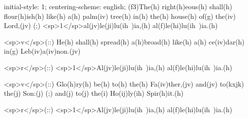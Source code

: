 initial-style: 1;
centering-scheme: english;
(f3)The(h) right(h)eous(h) shall(h) flour(h)ish(h) like(h) a(h) palm(iv) tree(h) in(h) the(h) house(h) of(g) the(iv) Lord,(jv) (;) <sp>1</sp>al(jv)le(ji)lu(ih~)ia,(h) al(f)le(hi)lu(ih~)ia.(h)

<sp>v</sp>(::) He(h) shall(h) spread(h) a(h)broad(h) like(h) a(h) ce(iv)dar(h) in(g) Leb(iv)a(iv)non.(jv)

<sp>r</sp>(::) <sp>1</sp>Al(jv)le(ji)lu(ih~)ia,(h) al(f)le(hi)lu(ih~)ia.(h)

<sp>v</sp>(::) Glo(h)ry(h) be(h) to(h) the(h) Fa(iv)ther,(jv) and(jv) to(kxjk) the(j) Son:(j) (;) and(j) to(j) the(i) Ho(ij)ly(ih) Spir(h)it.(h)

<sp>r</sp>(::) <sp>1</sp>Al(jv)le(ji)lu(ih~)ia,(h) al(f)le(hi)lu(ih~)ia.(h)